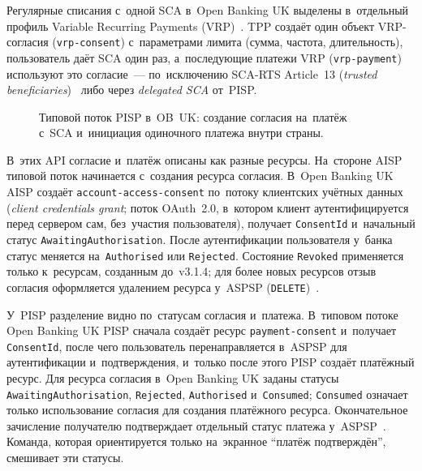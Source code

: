 Регулярные списания с~одной SCA в~Open Banking UK выделены в~отдельный
профиль Variable Recurring Payments (VRP)~\cite{openbanking-uk-vrp}. TPP создаёт
один объект VRP-согласия (\texttt{vrp-consent}) с~параметрами лимита (сумма,
частота, длительность), пользователь даёт SCA один раз, а~последующие платежи
VRP (\texttt{vrp-payment}) используют это согласие~--- по~исключению
SCA-RTS Article~13 (\textit{trusted beneficiaries})~\cite{eba-rts-sca} либо через
\textit{delegated SCA} от~PISP.

\begin{figure}[htbp]
  \centering
  \caption{Типовой поток PISP в~OB~UK: создание согласия на~платёж
    с~SCA и~инициация одиночного платежа внутри
  страны.}\label{fig:pisp-flow}
\end{figure}
\FloatBarrier

В~этих API согласие и~платёж описаны как разные ресурсы. На~стороне AISP
типовой поток начинается с~создания ресурса согласия. В~Open Banking UK AISP
создаёт \texttt{account-access-consent}
по~потоку клиентских учётных данных
(\textit{client credentials grant}; поток OAuth~2.0, в~котором клиент
аутентифицируется перед сервером сам, без~участия пользователя), получает
\texttt{ConsentId} и~начальный статус \texttt{AwaitingAuthorisation}. После
аутентификации пользователя у~банка статус меняется на~\texttt{Authorised} или
\texttt{Rejected}. Состояние \texttt{Revoked} применяется только
к~ресурсам, созданным до~v3.1.4; для более новых ресурсов отзыв согласия
оформляется удалением ресурса у~ASPSP
(\texttt{DELETE})~\cite{openbanking-uk-account-access-consents,ob-uk-at-3110}.

У~PISP разделение видно по~статусам согласия и~платежа. В~типовом потоке Open
Banking UK PISP сначала создаёт ресурс \texttt{payment-consent} и~получает
\texttt{ConsentId}, после чего пользователь перенаправляется в~ASPSP для
аутентификации и~подтверждения, и~только после этого PISP создаёт платёжный ресурс.
Для ресурса согласия в~Open Banking UK заданы статусы \texttt{AwaitingAuthorisation},
\texttt{Rejected}, \texttt{Authorised} и~\texttt{Consumed}; \texttt{Consumed}
означает только использование согласия для создания платёжного ресурса.
Окончательное зачисление получателю подтверждает отдельный статус платежа
у~ASPSP~\cite{openbanking-uk-payment-initiation-profile,openbanking-uk-domestic-payment-consents}.
Команда, которая
ориентируется только на~экранное \enquote{платёж подтверждён}, смешивает эти
статусы.

